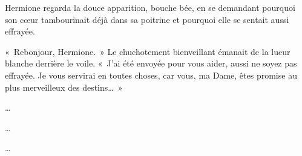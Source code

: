 Hermione regarda la douce apparition, bouche bée, en se demandant pourquoi son cœur tambourinait déjà dans sa poitrine et pourquoi elle se sentait aussi effrayée.

«~Rebonjour, Hermione.~» Le chuchotement bienveillant émanait de la lueur blanche derrière le voile. «~J'ai été envoyée pour vous aider, aussi ne soyez pas effrayée. Je vous servirai en toutes choses, car vous, ma Dame, êtes promise au plus merveilleux des destins…~»

\begin{center}
…

…

…
\end{center}

